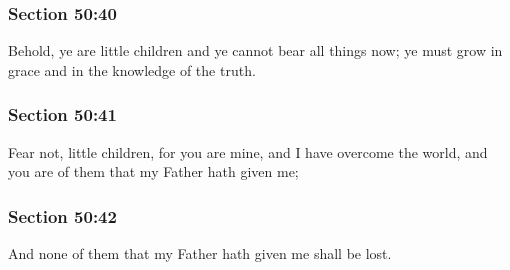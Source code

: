 	\subsubsection{Section 50:40} %
		\label{DC50-40}

		Behold, ye are little children and ye cannot bear all things now; ye must grow in grace and in the knowledge of the truth.


	\subsubsection{Section 50:41} %
		\label{DC50-41}

		Fear not, little children, for you are mine, and I have overcome the world, and you are of them that my Father hath given me;


	\subsubsection{Section 50:42} %
		\label{DC50-42}

		And none of them that my Father hath given me shall be lost.


